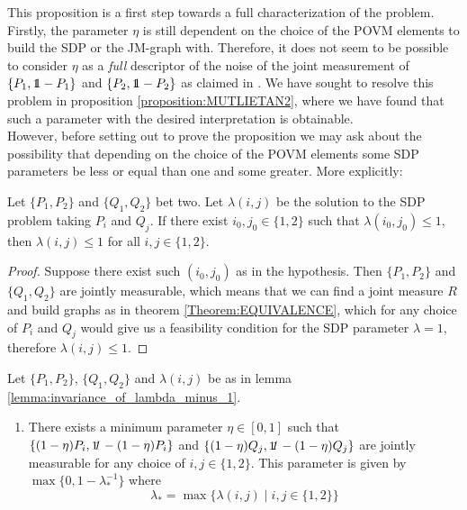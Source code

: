 \documentclass[10pt, a4paper]{amsart}
\begin{document}
This proposition is a first step towards a full characterization of the problem. Firstly, the parameter $\eta$ is still dependent on the choice of the POVM elements to build the SDP or the JM-graph with. Therefore, it does not seem to be possible to consider $\eta$ as a \textit{full} descriptor of the noise of the joint measurement of $\{P_{1}, \bbone - P_{1}\}$ and $\{P_{2}, \bbone - P_{2}\}$ as claimed in \cite{wolfgarcia}. We have sought to resolve this problem in proposition \ref{proposition:MUTLIETAN2}, where we have found that such a parameter with the desired interpretation is obtainable. \\
However, before setting out to prove the proposition we may ask about the possibility that depending on the choice of the POVM elements some SDP parameters be less or equal than one and some greater. More explicitly:

\begin{lemma}\label{lemma:invariance_of_lambda_minus_1}
Let $\{P_{1}, P_{2}\}$ and $\{Q_{1}, Q_{2}\}$ bet two. Let $\lambda(i,j)$ be the solution to the SDP problem taking $P_{i}$ and $Q_{j}$.   If there exist $i_{0}, j_{0}\in \{1,2\}$ such that $\lambda ( i_{0}, j_{0})\leq 1 $, then $\lambda ( i,j) \leq 1$ for all $i,j\in\{1,2\}$. 
\end{lemma}
\begin{proof}
Suppose there exist such $(i_{0}, j_{0})$ as in the hypothesis. Then $\{P_{1}, P_{2}\}$ and $\{Q_{1}, Q_{2}\}$ are jointly measurable, which means that we can find a joint measure $R$ and build graphs as in theorem \ref{Theorem:EQUIVALENCE}, which for any choice of $P_{i}$ and $Q_{j}$ would give us a feasibility condition for the SDP parameter $\lambda = 1$, therefore $\lambda (i,j) \leq 1$. 
\end{proof}
 



\begin{proposition}\label{proposition:MUTLIETAN2}
Let $\{P_{1}, P_{2}\}$,  $\{Q_{1}, Q_{2}\}$  and $\lambda(i,j)$ be as in lemma \ref{lemma:invariance_of_lambda_minus_1}. 
\begin{enumerate}
\item    There exists a minimum parameter $\eta \in [0,1]$ such that 
$\{(1-\eta)P_{i}, \mathit{\bbone} - (1-\eta)P_{i}\}$ and $\{(1-\eta)Q_{j}, \mathit{\bbone} - (1-\eta)Q_{j}\}$ are jointly measurable for any choice of $i,j\in \{1,2\}$. This parameter is given by $\max\{0, 1-\lambda_{*}^{-1}\}$ where 
$$
\lambda_{*} = \max\{
\lambda(i,j) \mid i,j\in\{1,2\}
\}
$$
\end{enumerate}
\end{proposition}
\end{document}
